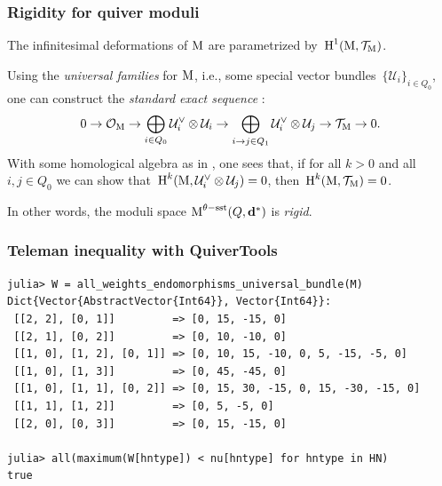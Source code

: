 \documentclass{beamer}
\begin{document}
\begin{frame}
    \frametitle{Rigidity for quiver moduli}
The infinitesimal deformations of $\operatorname{M}$ are parametrized
by~$\operatorname{H}^1(\operatorname{M}, \mathcal{T}_{\operatorname{M}})$. \pause

Using the \emph{universal families} for $\operatorname{M}$, i.e.,
some special vector bundles~$\{\mathcal{U}_i\}_{i \in Q_0}$,
one can construct the \emph{standard exact sequence} \cite{vector-fields-paper}:
\begin{equation}\label{equation:4-term-exact-sequence}
0
\overset{}{\rightarrow}\mathcal{O}_{\operatorname{M}}
\overset{}{\rightarrow}\bigoplus_{i \in Q_0} \mathcal{U}^\vee_i \otimes \mathcal{U}_i
\overset{}{\rightarrow}\bigoplus_{i \overset{}{\rightarrow} j \in Q_1} \mathcal{U}^\vee_{i} \otimes \mathcal{U}_{j}
\overset{}{\rightarrow}\mathcal{T}_{\operatorname{M}}
\overset{}{\rightarrow} 0.
\end{equation} \pause
With some homological algebra as in \cite{rigidity-paper}, one sees that, if for all $k > 0$ and all $i,j \in Q_0$
we can show that~$\operatorname{H}^k(\operatorname{M}, \mathcal{U}^{\vee}_i \otimes \mathcal{U}_j) = 0$,
then~$\operatorname{H}^k(\operatorname{M}, \mathcal{T}_{\operatorname{M}}) = 0$. \pause

In other words, the moduli space $\operatorname{M}^{\theta-\mathrm{sst}}(Q, \mathbf{d}^*)$
is \emph{rigid}.
\end{frame}

\begin{frame}[fragile]
    \frametitle{Teleman inequality with QuiverTools}
\scriptsize{
\begin{lstlisting}
julia> W = all_weights_endomorphisms_universal_bundle(M)
Dict{Vector{AbstractVector{Int64}}, Vector{Int64}}:
 [[2, 2], [0, 1]]         => [0, 15, -15, 0]
 [[2, 1], [0, 2]]         => [0, 10, -10, 0]
 [[1, 0], [1, 2], [0, 1]] => [0, 10, 15, -10, 0, 5, -15, -5, 0]
 [[1, 0], [1, 3]]         => [0, 45, -45, 0]
 [[1, 0], [1, 1], [0, 2]] => [0, 15, 30, -15, 0, 15, -30, -15, 0]
 [[1, 1], [1, 2]]         => [0, 5, -5, 0]
 [[2, 0], [0, 3]]         => [0, 15, -15, 0]

julia> all(maximum(W[hntype]) < nu[hntype] for hntype in HN)
true
\end{lstlisting}
}
\end{frame}
\end{document}
